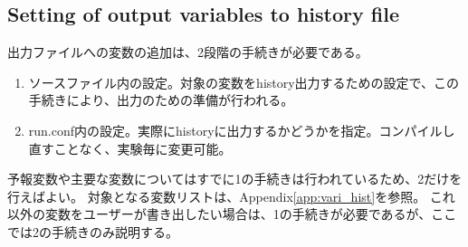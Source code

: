 \subsection{Setting of output variables to history file}
出力ファイルへの変数の追加は、2段階の手続きが必要である。
\begin{enumerate}
\item ソースファイル内の設定。対象の変数をhistory出力するための設定で、この手続きにより、出力のための準備が行われる。
\item run.conf内の設定。実際にhistoryに出力するかどうかを指定。コンパイルし直すことなく、実験毎に変更可能。
\end{enumerate}
予報変数や主要な変数についてはすでに1の手続きは行われているため、2だけを行えばよい。
対象となる変数リストは、Appendix\ref{app:vari_hist}を参照。
これ以外の変数をユーザーが書き出したい場合は、1の手続きが必要であるが、ここでは2の手続きのみ説明する。



